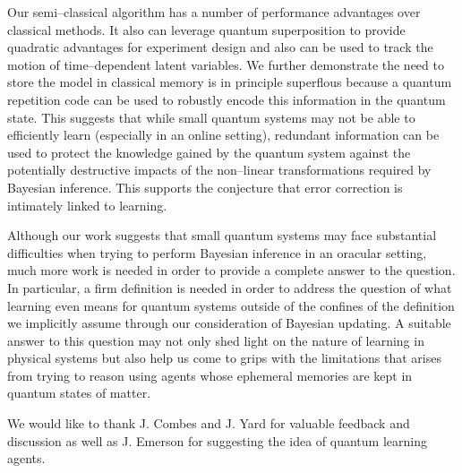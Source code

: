 \documentclass[aps,amsmath,onecolumn,amssymb]{revtex4}
\begin{document}
Our semi--classical algorithm has a number of performance advantages over classical methods.  It also can leverage quantum superposition to provide quadratic advantages for experiment design and also can be used to track the motion of time--dependent latent variables.  We further demonstrate the need to store the model in classical memory is in principle superflous because a quantum repetition code can be used to robustly encode this information in the quantum state.  This suggests that while small quantum systems may not be able to efficiently learn (especially in an online setting), redundant information can be used to protect the knowledge gained by the quantum system against the potentially destructive impacts of the non--linear transformations required by Bayesian inference.  This supports the conjecture that error correction is intimately linked to  learning.  

Although our work suggests that small quantum systems may face substantial difficulties when trying to perform Bayesian inference in an oracular setting, much more work is needed in order to provide a complete answer to the question.  In particular, a firm definition is needed in order to address the question of what learning even means for quantum systems outside of the confines of the definition we implicitly assume through our consideration of Bayesian updating.  A suitable answer to this question may not only shed light on the nature of learning in physical systems but also help us come to grips with the limitations that arises from trying to reason using agents whose ephemeral memories are kept in quantum states of matter.

\begin{acknowledgements}
We would like to thank J. Combes and J. Yard for valuable feedback and discussion as well as J. Emerson for suggesting the idea of quantum learning agents.
\end{acknowledgements}

\appendix
\end{document}
